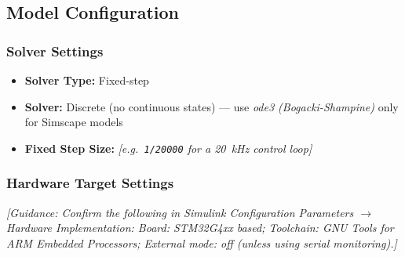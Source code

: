 %

\subsection{Model Configuration}

\subsubsection{Solver Settings}

\begin{itemize}
    \item \textbf{Solver Type:} Fixed-step
    \item \textbf{Solver:} Discrete (no continuous states)
          --- use \textit{ode3 (Bogacki-Shampine)} only for Simscape models
    \item \textbf{Fixed Step Size:} \textit{[e.g.\ \texttt{1/20000}
          for a \SI{20}{kHz} control loop]}
\end{itemize}

\subsubsection{Hardware Target Settings}

\textit{[Guidance: Confirm the following in Simulink Configuration
Parameters $\rightarrow$ Hardware Implementation:
Board: STM32G4xx based;
Toolchain: GNU Tools for ARM Embedded Processors;
External mode: off (unless using serial monitoring).]}


